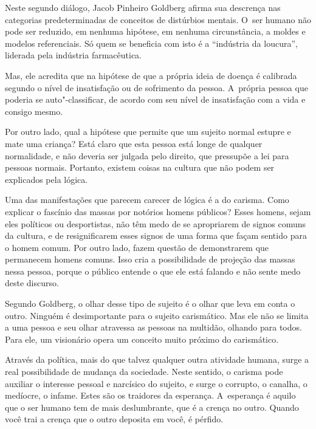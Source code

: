  


Neste segundo diálogo, Jacob Pinheiro Goldberg afirma sua descrença nas
categorias predeterminadas de conceitos de distúrbios mentais. O~ser
humano não pode ser reduzido, em nenhuma hipótese, em nenhuma
circunstância, a moldes e modelos referenciais. Só quem se beneficia com
isto é a ``indústria da loucura'', liderada pela indústria farmacêutica.

Mas, ele acredita que na hipótese de que a própria ideia de doença é
calibrada segundo o nível de insatisfação ou de sofrimento da pessoa. A~própria pessoa que poderia se auto"-classificar, de acordo com seu nível
de insatisfação com a vida e consigo mesmo.

Por outro lado, qual a hipótese que permite que um sujeito normal
estupre e mate uma criança? Está claro que esta pessoa está longe
de qualquer normalidade, e não deveria ser julgada pelo direito, que
pressupõe a lei para pessoas normais. Portanto, existem coisas na
cultura que não podem ser explicados pela lógica.

Uma das manifestações que parecem carecer de lógica é a do carisma. Como
explicar o fascínio das massas por notórios homens públicos? Esses
homens, sejam eles políticos ou desportistas, não têm medo de se
apropriarem de signos comuns da cultura, e de resignificarem esses
signos de uma forma que façam sentido para o homem comum. Por outro
lado, fazem questão de demonstrarem que permanecem homens comuns. Isso
cria a possibilidade de projeção das massas nessa pessoa, porque o
público entende o que ele está falando e não sente medo deste discurso.

Segundo Goldberg, o olhar desse tipo de sujeito é o olhar que leva em
conta o outro. Ninguém é desimportante para o sujeito carismático. Mas ele não
se limita a uma pessoa e seu olhar atravessa as pessoas na multidão,
olhando para todos. Para ele, um visionário opera um conceito muito
próximo do carismático.

Através da política, mais do que talvez qualquer outra atividade humana,
surge a real possibilidade de mudança da sociedade. Neste sentido, o
carisma pode auxiliar o interesse pessoal e narcísico do sujeito, e
surge o corrupto, o canalha, o medíocre, o infame. Estes são os
traidores da esperança. A~esperança é aquilo que o ser humano tem de
mais deslumbrante, que é a crença no outro. Quando você trai a crença
que o outro deposita em você, é pérfido.

